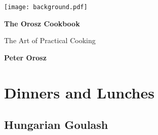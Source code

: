 \documentclass[
	11pt, %
	fleqn, %
	a4paper, %
]{LegrandOrangeBook}
\begin{document}

\titlepage %
	{\texttt{[image: background.pdf]}} %
	{ %
		\centering\sffamily %
		{\Huge\bfseries The Orosz Cookbook\par} %
		\vspace{16pt} %
		{\LARGE The Art of Practical Cooking\par} %
		\vspace{24pt} %
		{\huge\bfseries Peter Orosz\par} %
	}


\pagestyle{empty} %

\setcounter{tocdepth}{0}
\tableofcontents %

\pagestyle{fancy} %

\cleardoublepage %


\part{Dinners and Lunches}
	\chapterspaceabove{6.75cm}
	\chapterspacebelow{7.25cm}

	\chapter{Hungarian Goulash}
\end{document}

